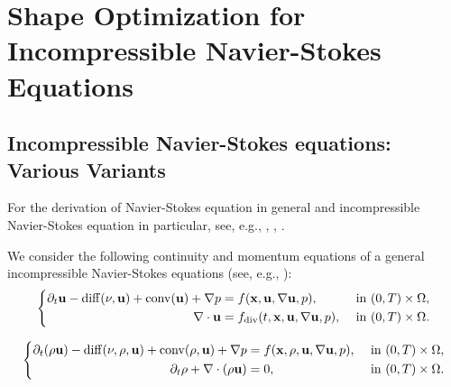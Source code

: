 \documentclass[oneside,11pt]{book}
\numberwithin{equation}{section}
\begin{document}
\chapter{Shape Optimization for Incompressible Navier-Stokes Equations}

\section{Incompressible Navier-Stokes equations: Various Variants}
For the derivation of Navier-Stokes equation in general and incompressible Navier-Stokes equation in particular, see, e.g., \cite{Ferziger_Peric_Street2020}, \cite{Moukalled_Mangani_Darwish2016}, \cite{Rebollo_Lewandowski2014}.

We consider the following continuity and momentum equations of a general incompressible Navier-Stokes equations (see, e.g., \cite[Subsubsect. 1.7.1]{Ferziger_Peric_Street2020}):
\begin{equation}
    \left\{\begin{split}
        \partial_t{\bf u} - \operatorname{diff}(\nu,{\bf u}) + \operatorname{conv}({\bf u}) + \nabla p &= f({\bf x},{\bf u},\nabla{\bf u},p),&&\mbox{ in }(0,T)\times\Omega,\\
        \nabla\cdot{\bf u} &= f_{\rm div}(t,{\bf x},{\bf u},\nabla{\bf u},p),&&\mbox{ in }(0,T)\times\Omega.
    \end{split}\right.
\end{equation}

\begin{equation}
    \left\{\begin{split}
        \partial_t(\rho{\bf u}) - \operatorname{diff}(\nu,\rho,{\bf u}) + \operatorname{conv}(\rho,{\bf u}) + \nabla p &= f({\bf x},\rho,{\bf u},\nabla{\bf u},p),&&\mbox{ in }(0,T)\times\Omega,\\
        \partial_t\rho + \nabla\cdot(\rho{\bf u}) &=0,&&\mbox{ in }(0,T)\times\Omega.
    \end{split}\right.
\end{equation}
\end{document}
